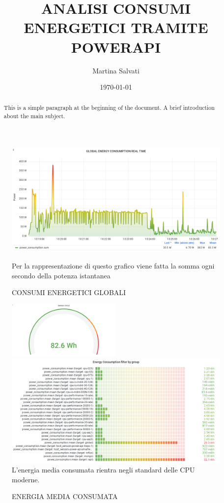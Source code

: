 \documentclass[a4paper, 11pt]{article}
\author{Martina Salvati}
\title{ANALISI CONSUMI ENERGETICI TRAMITE POWERAPI}
\date{\today} %
\begin{document}
\maketitle
\tableofcontents
\begin{abstract}
This is a simple paragraph at the beginning of the 
document. A brief introduction about the main subject.
\end{abstract}










\listoffigures

\begin{figure}[h]
\caption{CONSUMI ENERGETICI GLOBALI}
\centering
\includegraphics[scale=0.4]{image2}
\begin{flushleft}
{Per la rappresentazione di questo grafico viene fatta la somma ogni secondo della potenza istantanea}
\end{flushleft}
\end{figure}
\begin{figure}[h]
\caption{ENERGIA MEDIA CONSUMATA}
\centering
\includegraphics[width=0.5\textwidth]{image43}
\includegraphics[scale=0.4]{image41}
{L'energia media consumata rientra negli standard delle CPU moderne.}
\end{figure}
\end{document}
